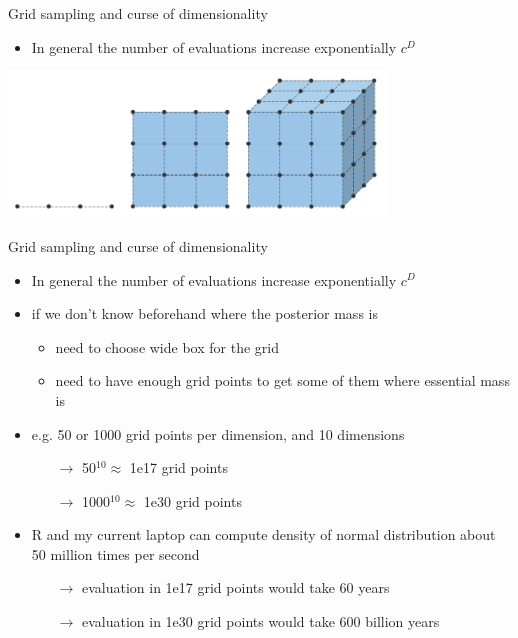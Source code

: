 \documentclass[english,t]{beamer}
\begin{document}
\begin{frame}{Grid sampling and curse of dimensionality}

  \begin{itemize}
  \item In general the number of evaluations increase exponentially $c^D$
  \end{itemize}
  \vspace{-0.5\baselineskip}
  \begin{center}
    \includegraphics[width=10cm]{grid_dimensions.png}
  \end{center}
\end{frame}



\begin{frame}{Grid sampling and curse of dimensionality}

  \begin{itemize}
  \item In general the number of evaluations increase exponentially $c^D$
      \item if we don't know beforehand where the posterior mass is
        \begin{itemize}
          \item need to choose wide box for the grid
          \item need to have enough grid points to get some of them
            where essential mass is
          \end{itemize}
          \pause
      \item e.g. 50 or 1000 grid points per dimension, and 10 dimensions
        \begin{itemize}
        \item[$\rightarrow$] 50$^{10} \approx$ 1e17 grid points
        \item[$\rightarrow$] 1000$^{10} \approx$ 1e30 grid points
        \end{itemize}
      \item R and my current laptop can compute density of normal
        distribution about 50 million times per second
        \begin{itemize}
        \item[$\rightarrow$] evaluation in 1e17 grid points would take
           60 years %
        \item[$\rightarrow$] evaluation in 1e30 grid points would take
           600 billion years %
        \end{itemize}
 \end{itemize}
\vfill
 
\end{frame}
\end{document}
